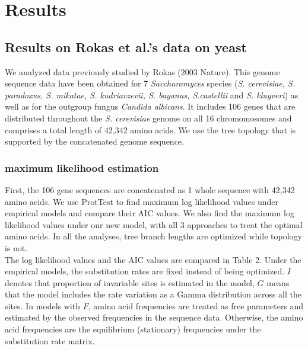 \documentclass[13pt]{article}
\begin{document}
\section{Results}


\subsection{Results on Rokas et al.'s data on yeast}
We analyzed data previously studied by Rokas (2003 Nature). This genome sequence data have been obtained for 7 {\it Saccharomyces} species ({\it S. cerevisiae, S. paradoxus, S. mikatae, S. kudriavzevii, S. bayanus, S.castellii} and {\it S. kluyveri}) as well as for the outgroup fungus {\it Candida albicans}. It includes 106 genes that are distributed throughout the {\it S. cerevisiae} genome on all 16 chromomosomes and comprises a total length of 42,342 amino acids. We use the tree topology that is supported by the concatenated genome sequence.\\

\subsubsection{maximum likelihood estimation}
First, the 106 gene sequences are concatenated as 1 whole sequence with 42,342 amino acids. We use ProtTest to find maximum log likelihood values under empirical models and compare their AIC values. We also find the maximum log likelihood values under our new model, with all 3 approaches to treat the optimal amino acids. In all the analyses, tree branch lengths are optimized while topology is not. \\

The log likelihood values and the AIC values are compared in Table 2. Under the empirical models, the substitution rates are fixed instead of being optimized. $I$ denotes that proportion of invariable sites is estimated in the model, $G$ means that the model includes the rate variation as a Gamma distribution across all the sites. In models with $F$, amino acid frequencies are treated as free parameters and estimated by the observed frequencies in the sequence data. Otherwise, the amino acid frequencies are the equilibrium (stationary) frequencies under the substitution rate matrix.\\
\end{document}
